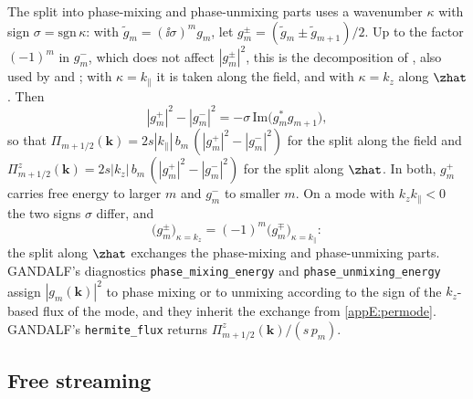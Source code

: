 The split into phase-mixing and phase-unmixing parts uses a wavenumber $\kappa$ with sign $\sigma=\mathrm{sgn}\,\kappa$: with $\tilde g_m=(\ii\sigma)^mg_m$, let $g^\pm_m=(\tilde g_m\pm\tilde g_{m+1})/2$. Up to the factor $(-1)^m$ in $g^-_m$, which does not affect $|g^\pm_m|^2$, this is the decomposition of \citet{Schekochihin2016}, also used by \citet{Kanekar2015} and \citet{Parker2016}; with $\kappa=k_\parallel$ it is taken along the field, and with $\kappa=k_z$ along $\zhat$. Then
\begin{equation}\label{appE:pm}
  |g^+_m|^2-|g^-_m|^2=-\sigma\,\mathrm{Im}\big(g_m^*g_{m+1}\big),
\end{equation}
so that $\Pi_{m+1/2}(\boldsymbol k)=2s|k_\parallel|\,b_m\,(|g^+_m|^2-|g^-_m|^2)$ for the split along the field and $\Pi^z_{m+1/2}(\boldsymbol k)=2s|k_z|\,b_m\,(|g^+_m|^2-|g^-_m|^2)$ for the split along $\zhat$. In both, $g^+_m$ carries free energy to larger $m$ and $g^-_m$ to smaller $m$. On a mode with $k_zk_\parallel<0$ the two signs $\sigma$ differ, and
\begin{equation*}
  \big(g^\pm_m\big)_{\kappa=k_z}=(-1)^m\big(g^\mp_m\big)_{\kappa=k_\parallel}:
\end{equation*}
the split along $\zhat$ exchanges the phase-mixing and phase-unmixing parts. GANDALF's diagnostics \texttt{phase\_mixing\_energy} and \texttt{phase\_unmixing\_energy} assign $|g_m(\boldsymbol k)|^2$ to phase mixing or to unmixing according to the sign of the $k_z$-based flux of the mode, and they inherit the exchange from \eqref{appE:permode}. GANDALF's \texttt{hermite\_flux} returns $\Pi^z_{m+1/2}(\boldsymbol k)/(s\,p_m)$.

\subsection{Free streaming}\label{appE:sec-free}

